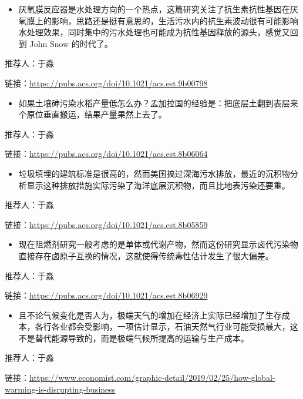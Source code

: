 \documentclass[]{book}
\providecommand{\tightlist}{%
  \setlength{\itemsep}{0pt}\setlength{\parskip}{0pt}}
\begin{document}
\begin{itemize}
\tightlist
\item
  厌氧膜反应器是水处理方向的一个热点，这篇研究关注了抗生素抗性基因在厌氧膜上的影响，思路还是挺有意思的，生活污水内的抗生素波动很有可能影响水处理效果，同时集中的污水处理也可能成为抗性基因释放的源头，感觉又回到 John Snow 的时代了。
\end{itemize}

推荐人：于淼

链接：\url{https://pubs.acs.org/doi/10.1021/acs.est.9b00798}

\begin{itemize}
\tightlist
\item
  如果土壤砷污染水稻产量低怎么办？孟加拉国的经验是：把底层土翻到表层来个原位垂直搬运，结果产量果然上去了。
\end{itemize}

推荐人：于淼

链接：\url{https://pubs.acs.org/doi/10.1021/acs.est.8b06064}

\begin{itemize}
\tightlist
\item
  垃圾填埋的建筑标准是很高的，然而美国搞过深海污水排放，最近的沉积物分析显示这种排放措施实际污染了海洋底层沉积物，而且比地表污染还要重。
\end{itemize}

推荐人：于淼

链接：\url{https://pubs.acs.org/doi/10.1021/acs.est.8b05859}

\begin{itemize}
\tightlist
\item
  现在阻燃剂研究一般考虑的是单体或代谢产物，然而这份研究显示卤代污染物直接存在卤原子互换的情况，这就使得传统毒性估计发生了很大偏差。
\end{itemize}

推荐人：于淼

链接：\url{https://pubs.acs.org/doi/10.1021/acs.est.8b06929}

\begin{itemize}
\tightlist
\item
  且不论气候变化是否人为，极端天气的增加在经济上实际已经增加了生存成本，各行各业都会受影响，一项估计显示，石油天然气行业可能受损最大，这不是替代能源导致的，而是极端气候所提高的运输与生产成本。
\end{itemize}

推荐人：于淼

链接：\url{https://www.economist.com/graphic-detail/2019/02/25/how-global-warming-is-disrupting-business}
\end{document}
